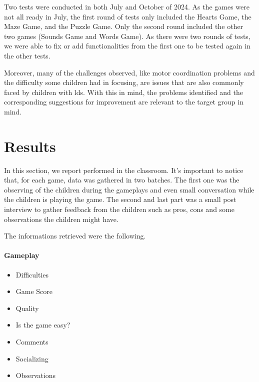 Two tests were conducted in both July and October of 2024. As the games were not all ready in July, the first round of tests only included the Hearts Game, the Maze Game, and the Puzzle Game. Only the second round included the other two games (Sounds Game and Words Game). As there were two rounds of tests, we were able to fix or add functionalities from the first one to be tested again in the other tests.

Moreover, many of the challenges observed, like motor coordination problems and the difficulty some children had in focusing, are issues that are also commonly faced by children with \gls{ld}s. With this in mind, the problems identified and the corresponding suggestions for improvement are relevant to the target group in mind.

\newpage
\section{Results}
\label{c5Results}

In this section, we report  performed in the classroom. It's important to notice that, for each game, data was gathered in two batches. The first one was the observing of the children during the gameplays and even small conversation while the children is playing the game. The second and last part was a small post interview to gather feedback from the children such as pros, cons and some observations the children might have.

The informations retrieved were the following.

\paragraph{Gameplay}
\begin{itemize}
    \item Difficulties
    \item Game Score
    \item Quality
    \item Is the game easy?
    \item Comments
    \item Socializing
    \item Observations
\end{itemize}

